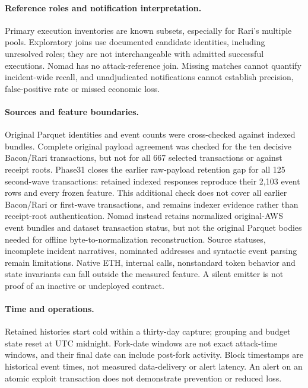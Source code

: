 \documentclass[preprint,12pt,authoryear]{elsarticle}
\begin{document}
\paragraph{Reference roles and notification interpretation.} Primary execution inventories are known subsets, especially for Rari's multiple pools. Exploratory joins use documented candidate identities, including unresolved roles; they are not interchangeable with admitted successful executions. Nomad has no attack-reference join. Missing matches cannot quantify incident-wide recall, and unadjudicated notifications cannot establish precision, false-positive rate or missed economic loss.

\paragraph{Sources and feature boundaries.} Original Parquet identities and event counts were cross-checked against indexed bundles. Complete original payload agreement was checked for the ten decisive Bacon/Rari transactions, but not for all 667 selected transactions or against receipt roots. Phase31 closes the earlier raw-payload retention gap for all 125 second-wave transactions: retained indexed responses reproduce their 2,103 event rows and every frozen feature. This additional check does not cover all earlier Bacon/Rari or first-wave transactions, and remains indexer evidence rather than receipt-root authentication. Nomad instead retains normalized original-AWS event bundles and dataset transaction status, but not the original Parquet bodies needed for offline byte-to-normalization reconstruction. Source statuses, incomplete incident narratives, nominated addresses and syntactic event parsing remain limitations. Native ETH, internal calls, nonstandard token behavior and state invariants can fall outside the measured feature. A silent emitter is not proof of an inactive or undeployed contract.

\paragraph{Time and operations.} Retained histories start cold within a thirty-day capture; grouping and budget state reset at UTC midnight. Fork-date windows are not exact attack-time windows, and their final date can include post-fork activity. Block timestamps are historical event times, not measured data-delivery or alert latency. An alert on an atomic exploit transaction does not demonstrate prevention or reduced loss.
\end{document}
